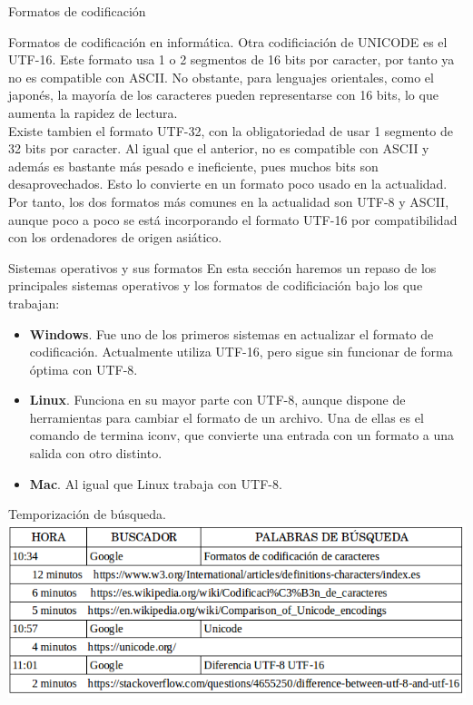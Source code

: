 \begin{section}{Formatos de codificaci\'on}
\begin{subsection}{Formatos de codificación en informática.}
			Otra codificiación de UNICODE es el UTF-16. Este formato usa 1 o 2 segmentos de 16 bits por caracter, por tanto ya no es compatible con ASCII. No obstante, para lenguajes orientales, como el japonés, la mayoría de los caracteres pueden representarse con 16 bits, lo que aumenta la rapidez de lectura. \\ 
			
			Existe tambien el formato UTF-32, con la obligatoriedad de usar 1 segmento de 32 bits por caracter. Al igual que el anterior, no es compatible con ASCII y además es bastante más pesado e ineficiente, pues muchos bits son desaprovechados. Esto lo convierte en un formato poco usado en la actualidad. \\
			
			Por tanto, los dos formatos más comunes en la actualidad son UTF-8 y ASCII, aunque poco a poco se está incorporando el formato UTF-16 por compatibilidad con los ordenadores de origen asiático.
			
			
		\end{subsection}
		
		\begin{subsection}{Sistemas operativos y sus formatos}
			En esta sección haremos un repaso de los principales sistemas operativos y los formatos de codificiación bajo los que trabajan:
			
			\begin{itemize}
				\item \textbf{Windows}. Fue uno de los primeros sistemas en actualizar el formato de codificación. Actualmente utiliza UTF-16, pero sigue sin funcionar de forma óptima con UTF-8.
				
				\item \textbf{Linux}. Funciona en su mayor parte con UTF-8, aunque dispone de herramientas para cambiar el formato de un archivo. Una de ellas es el comando de termina iconv, que convierte una entrada con un formato a una salida con otro distinto.   
				
				\item \textbf{Mac}. Al igual que Linux trabaja con UTF-8.
				
			\end{itemize}
		\end{subsection}
		
		\begin{subsection}{Temporizaci\'on de b\'usqueda.}
			\includegraphics[width=1\textwidth]{codificacion_tiempos.png}
		\end{subsection}
		
	\end{section}


